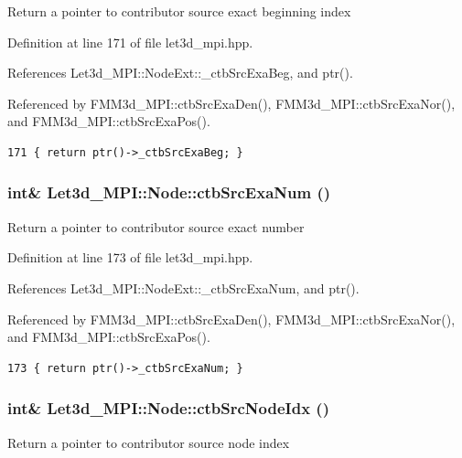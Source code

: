 Return a pointer to contributor source exact beginning index 

Definition at line 171 of file let3d\_\-mpi.hpp.

References Let3d\_\-MPI::Node\-Ext::\_\-ctb\-Src\-Exa\-Beg, and ptr().

Referenced by FMM3d\_\-MPI::ctb\-Src\-Exa\-Den(), FMM3d\_\-MPI::ctb\-Src\-Exa\-Nor(), and FMM3d\_\-MPI::ctb\-Src\-Exa\-Pos().

\footnotesize\begin{verbatim}171 { return ptr()->_ctbSrcExaBeg; }
\end{verbatim}\normalsize 


\subsubsection{\setlength{\rightskip}{0pt plus 5cm}int\& Let3d\_\-MPI::Node::ctb\-Src\-Exa\-Num ()\hspace{0.3cm}{\tt  [inline]}}\label{classLet3d__MPI_1_1Node_40c5f415ea514130096f9a032455a556_40c5f415ea514130096f9a032455a556}


Return a pointer to contributor source exact number 

Definition at line 173 of file let3d\_\-mpi.hpp.

References Let3d\_\-MPI::Node\-Ext::\_\-ctb\-Src\-Exa\-Num, and ptr().

Referenced by FMM3d\_\-MPI::ctb\-Src\-Exa\-Den(), FMM3d\_\-MPI::ctb\-Src\-Exa\-Nor(), and FMM3d\_\-MPI::ctb\-Src\-Exa\-Pos().

\footnotesize\begin{verbatim}173 { return ptr()->_ctbSrcExaNum; }
\end{verbatim}\normalsize 


\subsubsection{\setlength{\rightskip}{0pt plus 5cm}int\& Let3d\_\-MPI::Node::ctb\-Src\-Node\-Idx ()\hspace{0.3cm}{\tt  [inline]}}\label{classLet3d__MPI_1_1Node_480fe3031d93762b58296a762374103c_480fe3031d93762b58296a762374103c}


Return a pointer to contributor source node index 

